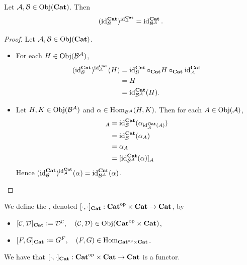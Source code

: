 \documentclass{book}
\begin{document}
	\begin{ex} 
		Let $\MA, \MB \in \Obj(\bCat)$. Then
		$$(\id_{\MB}^{\bCat})^{\id_{\MA}^{\bCat}} = \id_{\MB^{\MA}}^{\bCat}.$$
	\end{ex}
	
	\begin{proof}
		Let $\MA, \MB \in \Obj(\bCat)$. 
		\begin{itemize}
			\item For each $H \in \Obj(\MB^{\MA})$, 
			\begin{align*}
				(\id_{\MB}^{\bCat})^{\id_{\MA}^{\bCat}}(H) 
				& = \id_{\MB}^{\bCat} \circ_{\bCat} H \circ_{\bCat} \id_{\MA}^{\bCat} \\
				& = H \\
				& = \id_{\MB^{\MA}}^{\bCat}(H).
			\end{align*}
			\item Let $H,K \in \Obj(\MB^{\MA})$ and $\al \in \Hom_{\MB^{\MA}}(H, K)$. Then for each $A \in \Obj(\MA)$,
			\begin{align*}
				[(\id_{\MB}^{\bCat})^{\id_{\MA}^{\bCat}}(\al)]_A
				& = \id_{\MB}^{\bCat}(\al_{\id_{\MA}^{\bCat}(A)}) \\
				& = \id_{\MB}^{\bCat}(\al_A) \\
				& = \al_A \\
				& = [\id_{\MB^{\MA}}^{\bCat}(\al)]_A
			\end{align*}
			Hence $(\id_{\MB}^{\bCat})^{\id_{\MA}^{\bCat}}(\al) = \id_{\MB^{\MA}}^{\bCat}(\al)$.
		\end{itemize}
	\end{proof}
	
	\begin{defn} 
		We define the , denoted $[\cdot, \cdot]_{\bCat}: \op{\bCat} \times \bCat \rightarrow \bCat$, by 
		\begin{itemize}
			\item $[\MC, \MD]_{\bCat} \defeq \MD^{\MC}, \quad (\MC, \MD) \in \Obj(\op{\bCat} \times \bCat)$,
			\item $[F, G]_{\bCat} \defeq G^F, \quad (F, G) \in \Hom_{\op{\bCat} \times \bCat}$.
		\end{itemize}
	\end{defn}
	
	\begin{ex} 
		We have that $[\cdot, \cdot]_{\bCat}: \op{\bCat} \times \bCat \rightarrow \bCat$ is a functor.
	\end{ex}
	
\end{document}
